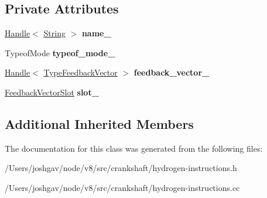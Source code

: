\subsection*{Private Attributes}
\begin{DoxyCompactItemize}
\item 
\hyperlink{classv8_1_1internal_1_1_handle}{Handle}$<$ \hyperlink{classv8_1_1internal_1_1_string}{String} $>$ {\bfseries name\+\_\+}\hypertarget{classv8_1_1internal_1_1_h_load_global_generic_ad5819f1f17bcd08992b841020862f466}{}\label{classv8_1_1internal_1_1_h_load_global_generic_ad5819f1f17bcd08992b841020862f466}

\item 
Typeof\+Mode {\bfseries typeof\+\_\+mode\+\_\+}\hypertarget{classv8_1_1internal_1_1_h_load_global_generic_a9f3aedd907cbf6c577d2ab14f727b6df}{}\label{classv8_1_1internal_1_1_h_load_global_generic_a9f3aedd907cbf6c577d2ab14f727b6df}

\item 
\hyperlink{classv8_1_1internal_1_1_handle}{Handle}$<$ \hyperlink{classv8_1_1internal_1_1_type_feedback_vector}{Type\+Feedback\+Vector} $>$ {\bfseries feedback\+\_\+vector\+\_\+}\hypertarget{classv8_1_1internal_1_1_h_load_global_generic_a7b5e5b4b16f319fb402e5ba1949ecb5a}{}\label{classv8_1_1internal_1_1_h_load_global_generic_a7b5e5b4b16f319fb402e5ba1949ecb5a}

\item 
\hyperlink{classv8_1_1internal_1_1_feedback_vector_slot}{Feedback\+Vector\+Slot} {\bfseries slot\+\_\+}\hypertarget{classv8_1_1internal_1_1_h_load_global_generic_a775df960a595a1fb0ef60a11f08dc9bc}{}\label{classv8_1_1internal_1_1_h_load_global_generic_a775df960a595a1fb0ef60a11f08dc9bc}

\end{DoxyCompactItemize}
\subsection*{Additional Inherited Members}


The documentation for this class was generated from the following files\+:\begin{DoxyCompactItemize}
\item 
/\+Users/joshgav/node/v8/src/crankshaft/hydrogen-\/instructions.\+h\item 
/\+Users/joshgav/node/v8/src/crankshaft/hydrogen-\/instructions.\+cc\end{DoxyCompactItemize}
